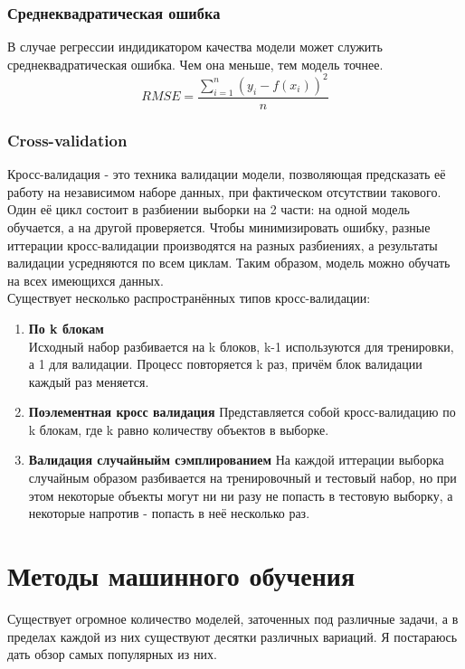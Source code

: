 \documentclass{article}
\begin{document}
        \subsubsection*{Среднеквадратическая ошибка}
            В случае регрессии индидикатором качества модели может служить среднеквадратическая ошибка. Чем она меньше, тем модель точнее.
            $$RMSE = \frac{\sum\limits_{i=1}^n(y_i - f(x_i))^2}{n}$$
        \subsubsection*{Cross-validation}
            Кросс-валидация - это техника валидации модели, позволяющая предсказать её работу на независимом наборе данных, при фактическом отсутствии такового. Один её цикл состоит в разбиении выборки на  2 части: на одной модель обучается, а на другой проверяется. Чтобы минимизировать ошибку, разные иттерации кросс-валидации производятся на разных разбиениях, а результаты валидации усредняются по всем циклам. Таким образом, модель можно обучать на всех имеющихся данных. \\
            Существует несколько распространённых типов кросс-валидации:
            \begin{enumerate}
                \item \textbf{По k блокам} \\
                    Исходный набор разбивается на k блоков, k-1 используются для тренировки, а 1 для валидации. Процесс повторяется k раз, причём блок валидации каждый раз меняется.
                \item \textbf{Поэлементная кросс валидация}
                    Представляется собой кросс-валидацию по k блокам, где k равно количеству объектов в выборке.
                \item \textbf{Валидация случайныйм сэмплированием}
                    На каждой иттерации выборка случайным образом разбивается на тренировочный и тестовый набор, но при этом некоторые объекты могут ни ни разу не попасть в тестовую выборку, а некоторые напротив - попасть в неё несколько раз.
            \end{enumerate}
            

\section*{Методы машинного обучения}
    Существует огромное количество моделей, заточенных под различные задачи, а   в пределах каждой из них существуют десятки различных вариаций. Я постараюсь дать обзор самых популярных из них.
    
\end{document}
